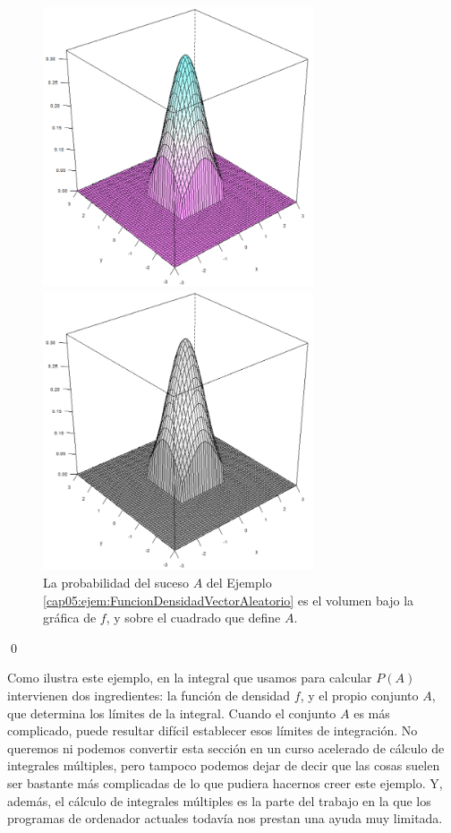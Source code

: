 \begin{ejemplo}
  \begin{figure}[thb]
	\begin{center}
	\begin{enColor}
    \includegraphics[width=8cm]{../fig/Cap05-RegionIntegracionEjemploDensidadVectorAleatorio2.png}
	\end{enColor}
	\begin{bn}
    \includegraphics[width=8cm]{../fig/Cap05-RegionIntegracionEjemploDensidadVectorAleatorio2-bn.png}
	\end{bn}
	\caption{La probabilidad del suceso $A$ del Ejemplo \ref{cap05:ejem:FuncionDensidadVectorAleatorio} es
    el volumen bajo la gráfica de $f$, y sobre el cuadrado que define $A$.}
	\label{cap01:fig:RegionIntegracionEjemploDensidadVectorAleatorio2}
    \end{center}
  \end{figure}
\qed
\end{ejemplo}
Como ilustra este ejemplo, en la integral que usamos para calcular $P(A)$ intervienen dos ingredientes: la función de densidad $f$, y el propio conjunto $A$, que determina los límites de la integral. Cuando el conjunto $A$ es más complicado, puede resultar difícil  establecer esos límites de integración. No queremos ni podemos convertir esta sección en un curso acelerado de cálculo de integrales múltiples, pero tampoco podemos dejar de decir que las cosas suelen ser bastante más complicadas de lo que pudiera hacernos creer este ejemplo. Y, además, el cálculo de integrales múltiples es la parte del trabajo en la que los programas de ordenador actuales todavía nos prestan una ayuda muy limitada.

